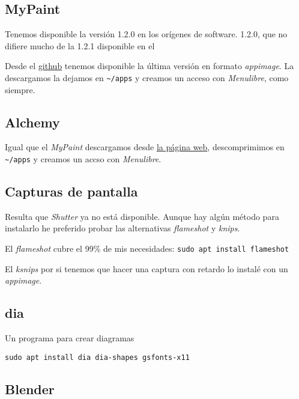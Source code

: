 \documentclass[
  12pt,
  spanish,
]{article}
\begin{document}
\hypertarget{mypaint}{%
\subsection{MyPaint}\label{mypaint}}

Tenemos disponible la versión 1.2.0 en los orígenes de software. 1.2.0,
que no difiere mucho de la 1.2.1 disponible en el

Desde el \href{https://github.com/mypaint/}{github} tenemos disponible
la última versión en formato \emph{appimage}. La descargamos la dejamos
en \texttt{\textasciitilde{}/apps} y creamos un acceso con
\emph{Menulibre}, como siempre.

\hypertarget{alchemy}{%
\subsection{Alchemy}\label{alchemy}}

Igual que el \emph{MyPaint} descargamos desde
\href{http://al.chemy.org}{la página web}, descomprimimos en
\texttt{\textasciitilde{}/apps} y creamos un accso con \emph{Menulibre}.

\hypertarget{capturas-de-pantalla}{%
\subsection{Capturas de pantalla}\label{capturas-de-pantalla}}

Resulta que \emph{Shutter} ya no está disponible. Aunque hay algún
método para instalarlo he preferido probar las alternativas
\emph{flameshot} y \emph{knips}.

El \emph{flameshot} cubre el 99\% de mis necesidades:
\texttt{sudo\ apt\ install\ flameshot}

El \emph{ksnips} por si tenemos que hacer una captura con retardo lo
instalé con un \emph{appimage}.

\hypertarget{dia}{%
\subsection{dia}\label{dia}}

Un programa para crear diagramas

\begin{verbatim}
sudo apt install dia dia-shapes gsfonts-x11
\end{verbatim}

\hypertarget{blender}{%
\subsection{Blender}\label{blender}}
\end{document}
